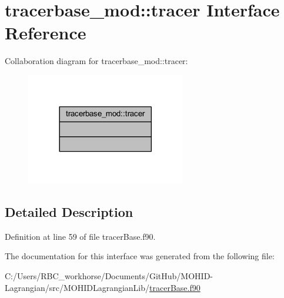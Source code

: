 \hypertarget{interfacetracerbase__mod_1_1tracer}{}\section{tracerbase\+\_\+mod\+:\+:tracer Interface Reference}
\label{interfacetracerbase__mod_1_1tracer}


Collaboration diagram for tracerbase\+\_\+mod\+:\+:tracer\+:\nopagebreak
\begin{figure}[H]
\begin{center}
\leavevmode
\includegraphics[width=197pt]{interfacetracerbase__mod_1_1tracer__coll__graph}
\end{center}
\end{figure}


\subsection{Detailed Description}


Definition at line 59 of file tracer\+Base.\+f90.



The documentation for this interface was generated from the following file\+:\begin{DoxyCompactItemize}
\item 
C\+:/\+Users/\+R\+B\+C\+\_\+workhorse/\+Documents/\+Git\+Hub/\+M\+O\+H\+I\+D-\/\+Lagrangian/src/\+M\+O\+H\+I\+D\+Lagrangian\+Lib/\mbox{\hyperlink{tracer_base_8f90}{tracer\+Base.\+f90}}\end{DoxyCompactItemize}
